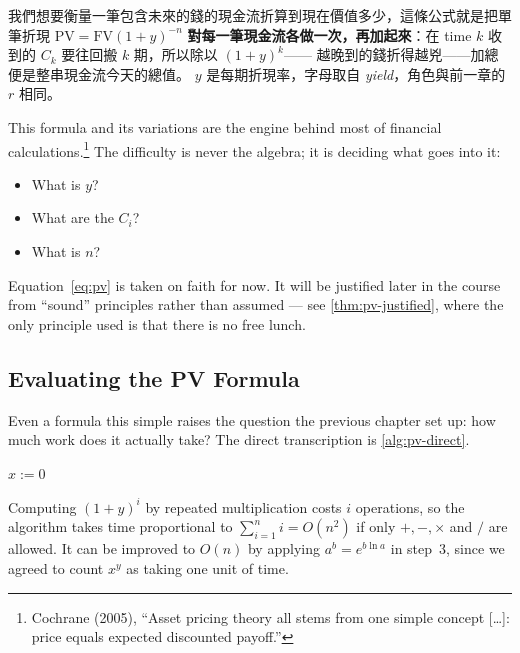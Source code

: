 \suppstart
\begin{remark}
	我們想要衡量一筆包含未來的錢的現金流折算到現在價值多少，這條公式就是把單筆折現 $\mathrm{PV}=\mathrm{FV}(1+y)^{-n}$ \textbf{對每一筆現金流各做一次，再加起來}：在 time $k$ 收到的 $C_{k}$ 要往回搬 $k$ 期，所以除以 $(1+y)^{k}$—— 越晚到的錢折得越兇——加總便是整串現金流今天的總值。
	$y$ 是每期折現率，字母取自 \emph{yield}，角色與前一章的 $r$ 相同。
\end{remark}
\suppend

This formula and its variations are the engine behind most of financial calculations.\footnote{Cochrane (2005), ``Asset pricing theory all stems from one simple concept [\ldots]: price equals expected discounted payoff.''} The difficulty is never the algebra; it is deciding what goes into it:

\begin{itemize}[nosep]
	\item What is $y$?
	\item What are the $C_{i}$?
	\item What is $n$?
\end{itemize}

\begin{note}
	Equation~\eqref{eq:pv} is taken on faith for now.
	It will be justified later in the course from ``sound'' principles rather than assumed --- see \autoref{thm:pv-justified}, where the only principle used is that there is no free lunch.
\end{note}

\subsection{Evaluating the PV Formula}


Even a formula this simple raises the question the previous chapter set up: how much work does it actually take?
The direct transcription is \autoref{alg:pv-direct}.

\begin{algorithm}[H]
	\caption{Evaluating the PV in Eq.~\eqref{eq:pv} directly}
	\label{alg:pv-direct}
	$x := 0$\;
	\;
\end{algorithm}

Computing $(1+y)^{i}$ by repeated multiplication costs $i$ operations, so the algorithm takes time proportional to $\sum_{i=1}^{n} i = O(n^{2})$ if only $+,-,\times$ and $/$ are allowed.
It can be improved to $O(n)$ by applying $a^{b} = e^{b\ln a}$ in step~3, since we agreed to count $x^{y}$ as taking one unit of time.

